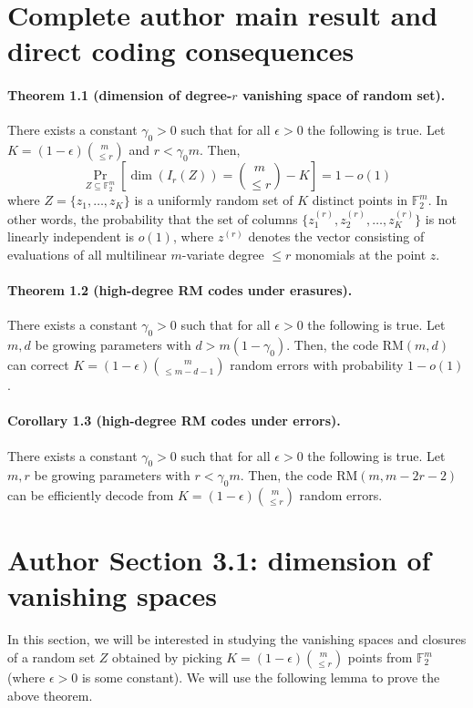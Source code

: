\documentclass[10pt,a4paper]{article}
\begin{document}
\section*{Complete author main result and direct coding consequences}
\paragraph{Theorem 1.1 (dimension of degree-$r$ vanishing space of random set).} There exists a constant $\gamma_0>0$ such that for all $\epsilon>0$ the following is true. Let $K=(1-\epsilon)\binom m{\le r}$ and $r<\gamma_0m$. Then,
\[\Pr_{Z\subseteq\mathbb F_2^m}\left[\dim(I_r(Z))=\binom m{\le r}-K\right]=1-o(1)\]
where $Z=\{z_1,\ldots,z_K\}$ is a uniformly random set of $K$ distinct points in $\mathbb F_2^m$. In other words, the probability that the set of columns $\{z_1^{(r)},z_2^{(r)},\ldots,z_K^{(r)}\}$ is not linearly independent is $o(1)$, where $z^{(r)}$ denotes the vector consisting of evaluations of all multilinear $m$-variate degree $\le r$ monomials at the point $z$.
\paragraph{Theorem 1.2 (high-degree RM codes under erasures).} There exists a constant $\gamma_0>0$ such that for all $\epsilon>0$ the following is true. Let $m,d$ be growing parameters with $d>m(1-\gamma_0)$. Then, the code $\mathrm{RM}(m,d)$ can correct $K=(1-\epsilon)\binom m{\le m-d-1}$ random errors with probability $1-o(1)$.
\paragraph{Corollary 1.3 (high-degree RM codes under errors).} There exists a constant $\gamma_0>0$ such that for all $\epsilon>0$ the following is true. Let $m,r$ be growing parameters with $r<\gamma_0m$. Then, the code $\mathrm{RM}(m,m-2r-2)$ can be efficiently decode from $K=(1-\epsilon)\binom m{\le r}$ random errors.

\section*{Author Section 3.1: dimension of vanishing spaces}
In this section, we will be interested in studying the vanishing spaces and closures of a random set $Z$ obtained by picking $K=(1-\epsilon)\binom m{\le r}$ points from $\mathbb F_2^m$ (where $\epsilon>0$ is some constant). We will use the following lemma to prove the above theorem.
\end{document}
